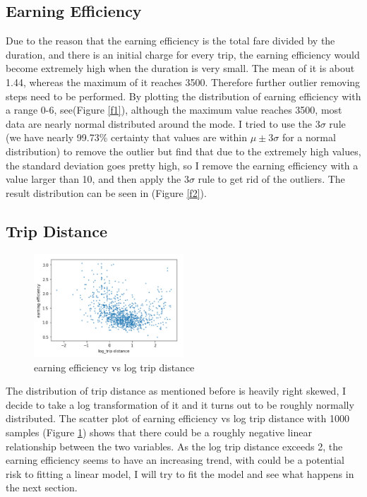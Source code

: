 \documentclass[11pt]{article}
\begin{document}
\subsection{Earning Efficiency}
Due to the reason that the earning efficiency is the total fare divided by the duration, and there is an initial charge for every trip, the earning efficiency would become extremely high when the duration is very small. The mean of it is about 1.44, whereas the maximum of it reaches 3500. Therefore further outlier removing steps need to be performed. By plotting the distribution of earning efficiency with a range 0-6, see(Figure \ref{f1}), although the maximum value reaches 3500, most data are nearly normal distributed around the mode. I tried to use the 3$\sigma$
rule (we have nearly 99.73\% certainty that values are within 
$\mu\pm 3\sigma$ for a normal distribution) to remove the outlier but find that due to the extremely high values, the standard deviation goes pretty high, so I remove the earning efficiency with a value larger than 10, and then apply the $3\sigma$
rule to get rid of the outliers. The result distribution can be seen in (Figure \ref{f2}).

\subsection{Trip Distance}


\begin{figure} 
        \centering
        \caption{earning efficiency vs log trip distance} \label{f3}
        \includegraphics[width=0.5\textwidth]{plots/scatter.jpg}
\end{figure}
The distribution of trip distance as mentioned before is heavily right skewed, I decide to take a log transformation of it and it turns out to be roughly normally distributed. The scatter plot of earning efficiency vs log trip distance with 1000 samples (Figure \ref{f3}) shows that there could be a roughly negative linear relationship between the two variables. As the log trip distance exceeds 2, the earning efficiency seems to have an increasing trend, with could be a potential risk to fitting a linear model, I will try to fit the model and see what happens in the next section.
\end{document}
